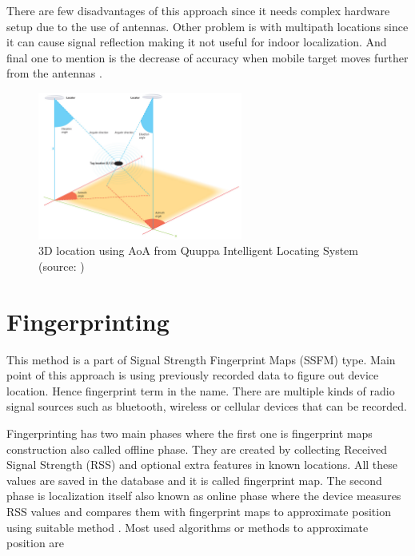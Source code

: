 There are few disadvantages of this approach since it needs complex hardware setup due to the use of antennas. Other problem is with multipath locations since it can cause signal reflection making it not useful for indoor localization. And final one to mention is the decrease of accuracy when mobile target moves further from the antennas \cite{AoA, RofAoA}.

\begin{figure}[h!]
	\begin{centering}
		\includegraphics[width=0.6\textwidth]{img/angulation}
		\par\end{centering}
	\caption{3D location using AoA from Quuppa Intelligent Locating System (source: \cite{QAoA})\label{fig:AoAQuuppa}}
	\label{fig4}
\end{figure}

\section{Fingerprinting}\label{sec:Fingerprinting}
This method is a part of Signal Strength Fingerprint Maps (SSFM) type. Main point of this approach is using previously recorded data to figure out device location. Hence fingerprint term in the name. There are multiple kinds of radio signal sources such as bluetooth, wireless or cellular devices that can be recorded.

Fingerprinting has two main phases where the first one is fingerprint maps construction also called offline phase. They are created by collecting Received Signal Strength (RSS) and optional extra features in known locations. All these values are saved in the database and it is called fingerprint map. The second phase is localization itself also known as online phase where the device measures RSS values and compares them with fingerprint maps to approximate position using suitable method \cite{LocalizationApproaches, ILWTP}. Most used algorithms or methods to approximate position are \cite{IILUBLEB}

